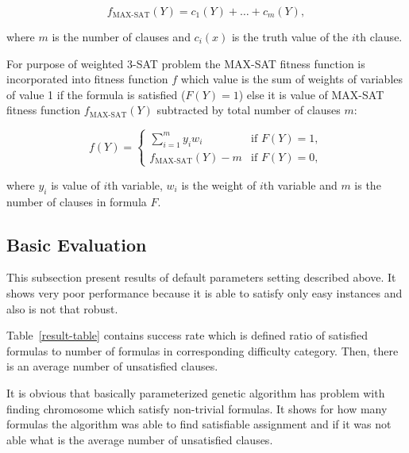 \documentclass{article}
\begin{document}
$$f_{\text{MAX-SAT}}(Y) = c_1(Y) + \dots + c_m(Y),$$

where $m$ is the number of clauses and $c_i(x)$ is the truth value of the $i$th
clause.

For purpose of weighted 3-SAT problem the MAX-SAT fitness function is
incorporated into fitness function $f$
which value is the sum of weights of variables of value 1
if the formula is satisfied ($F(Y) = 1$)
else it is value of MAX-SAT fitness function $f_{\text{MAX-SAT}}(Y)$
subtracted by total number of clauses $m$:

$$
f(Y) = 
\begin{cases} 
    \sum_{i = 1}^m y_i w_i & \text{if } F(Y) = 1, \\
    f_{\text{MAX-SAT}}(Y) - m & \text{if } F(Y) = 0,
\end{cases}
$$

where $y_i$ is value of $i$th variable, $w_i$ is the weight of $i$th
variable and $m$ is the number of clauses in formula $F$.

\subsection{Basic Evaluation}

This subsection present results of default parameters setting described above.
It shows very poor performance
because it is able to satisfy only easy instances
and also is not that robust.

Table~\ref{result-table} contains success rate which is defined ratio
of satisfied formulas to number of formulas
in corresponding difficulty category.
Then, there is an average number of unsatisfied clauses.

It is obvious that basically parameterized genetic algorithm has problem
with finding chromosome which satisfy non-trivial formulas.
It shows for how many formulas the algorithm was able to find satisfiable
assignment and if it was not able what is the average number of unsatisfied
clauses.
\end{document}
